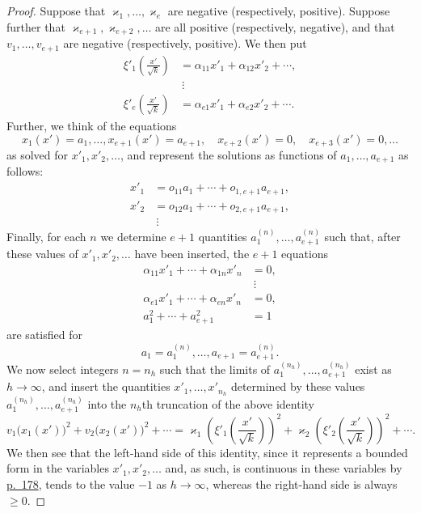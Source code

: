\documentclass[b5paper,twoside]{article}
\newcommand{\originalpage}[1]{\phantomsection\label{origpage:#1}}
\begin{document}
\begin{proof}
Suppose that $\varkappa_1,\ldots,\varkappa_e$ are negative (respectively,
positive). Suppose further that $\varkappa_{e+1},\varkappa_{e+2},\ldots$ are
all positive (respectively, negative), and that $v_1,\ldots,v_{e+1}$ are
negative (respectively, positive). We then put
\begin{align*}
  \xi'_1\!\left(\frac{x'}{\sqrt{k}}\right)
    &=\alpha_{11}x'_1+\alpha_{12}x'_2+\cdots,\\
  &\ \vdots\\
  \xi'_e\!\left(\frac{x'}{\sqrt{k}}\right)
    &=\alpha_{e1}x'_1+\alpha_{e2}x'_2+\cdots.
\end{align*}
Further, we think of the equations
\[
  x_1(x')=a_1,\ldots,x_{e+1}(x')=a_{e+1},\quad
  x_{e+2}(x')=0,\quad x_{e+3}(x')=0,\ldots
\]
as solved for $x'_1,x'_2,\ldots$, and represent the solutions as functions
\originalpage{214}
of $a_1,\ldots,a_{e+1}$ as follows:
\begin{align*}
  x'_1&=o_{11}a_1+\cdots+o_{1,e+1}a_{e+1},\\
  x'_2&=o_{12}a_1+\cdots+o_{2,e+1}a_{e+1},\\
  &\ \vdots
\end{align*}
Finally, for each $n$ we determine $e+1$ quantities
$a_1^{(n)},\ldots,a_{e+1}^{(n)}$ such that, after these values of
$x'_1,x'_2,\ldots$ have been inserted, the $e+1$ equations
\begin{align*}
  \alpha_{11}x'_1+\cdots+\alpha_{1n}x'_n&=0,\\
  &\ \vdots\\
  \alpha_{e1}x'_1+\cdots+\alpha_{en}x'_n&=0,\\
  a_1^2+\cdots+a_{e+1}^2&=1
\end{align*}
are satisfied for
\[
  a_1=a_1^{(n)},\ldots,a_{e+1}=a_{e+1}^{(n)}.
\]
We now select integers $n=n_h$ such that the limits of
$a_1^{(n_h)},\ldots,a_{e+1}^{(n_h)}$ exist as $h\to\infty$, and insert the
quantities $x'_1,\ldots,x'_{n_h}$ determined by these values
$a_1^{(n_h)},\ldots,a_{e+1}^{(n_h)}$ into the $n_h$th truncation of the above
identity
\[
  v_1\bigl(x_1(x')\bigr)^2+v_2\bigl(x_2(x')\bigr)^2+\cdots
  =\varkappa_1\left(\xi'_1\!\left(\frac{x'}{\sqrt{k}}\right)\right)^2
  +\varkappa_2\left(\xi'_2\!\left(\frac{x'}{\sqrt{k}}\right)\right)^2
  +\cdots.
\]
We then see that the left-hand side of this identity, since it represents a
bounded form in the variables $x'_1,x'_2,\ldots$ and, as such, is continuous
in these variables by \hyperref[origpage:178]{p.~178}, tends to the value
$-1$ as $h\to\infty$, whereas the right-hand side is always $\geq0$.


\end{proof}
\end{document}
